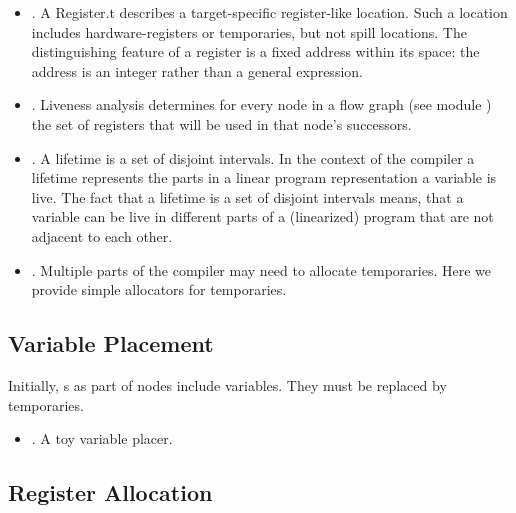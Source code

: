 \documentclass{article}%
\begin{document}
\begin{itemize}

\item {}. A {\Tt{}Register.t\nwendquote} describes a
target-specific register-like location.  Such a location includes
hardware-registers or temporaries, but not spill locations.  The
distinguishing feature of a register is a fixed address within its
space: the address is an integer rather than a general expression.

\item {}. Liveness analysis determines for every node
in a flow graph (see module ) the set of registers
that will be used in that node's successors. 


\item {}. A lifetime is a set of disjoint
intervals.  In the context of the {\qcc} compiler a lifetime represents
the parts in a linear program representation a variable is live.  The
fact that a lifetime is a set of disjoint intervals means, that a
variable can be live in different parts of a (linearized) program that
are not adjacent to each other.

\item {}. Multiple parts of the compiler may need to
allocate temporaries.  Here we provide simple allocators for
temporaries.

\end{itemize}

\subsection{Variable Placement}

Initially, {\rtl}s as part of {\cfg} nodes include variables. They must
be replaced by temporaries.

\begin{itemize}
\item {}. A toy variable placer.
\end{itemize}

\subsection{Register Allocation}
\end{document}
